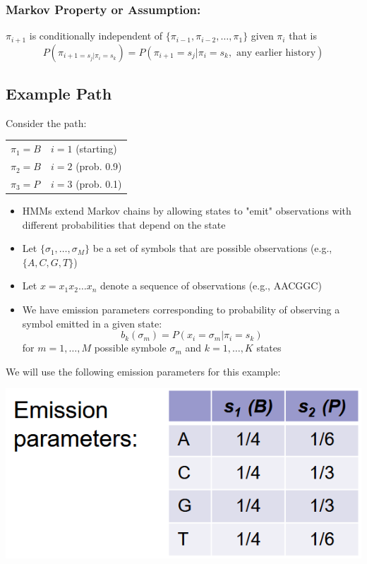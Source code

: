 \documentclass[10pt]{article}
\begin{document}
\subsubsection*{Markov Property or Assumption:}
$\pi_{i + 1}$ is conditionally independent of $\{\pi_{i - 1}, \pi_{i - 2}, \dots, \pi_1\}$ given $\pi_i$ that is
\[P(\pi_{i + 1 = s_j | \pi_i = s_k}) = P(\pi_{i + 1} = s_j| \pi_i = s_k, \text{ any earlier history})\]
\subsection*{Example Path}
Consider the path:
\begin{center}
\begin{tabular}{ll}
$\pi_1 = B$ & $i = 1$ (starting)\\
$\pi_2 = B$ & $i = 2$ (prob. 0.9)\\
$\pi_3 = P$ & $i = 3$ (prob. 0.1)
\end{tabular}
\end{center}
\begin{itemize}
	\item HMMs extend Markov chains by allowing states to "emit" observations with different probabilities that depend on the state
	\item Let $\{\sigma_1, \dots, \sigma_M\}$ be a set of symbols that are possible observations (e.g., $\{A, C, G, T\}$)
	\item Let $x = x_1 x_2 \dots x_n$ denote a sequence of observations (e.g., AACGGC)
	\item We have emission parameters corresponding to probability of observing a symbol emitted in a given state:
	\[b_k(\sigma_m) = P(x_i = \sigma_m | \pi_i = s_k)\]
    for $m = 1, \dots, M$ possible symbole $\sigma_m$ and $k = 1, \dots, K$ states
\end{itemize}
We will use the following emission parameters for this example:
\begin{center} 
	\includegraphics*[scale=0.4]{W9_12.png} 
\end{center}
\end{document}
